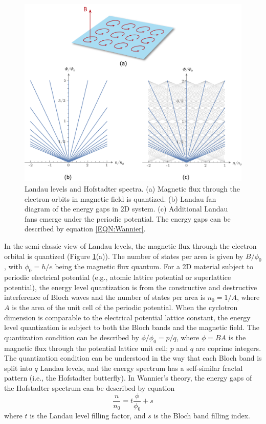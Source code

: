 \documentclass[pdflatex, sectionletters, 12pt]{pittetd}    %
\begin{document}
\begin{figure}[h!]
	\centering
	\includegraphics[width=1.0\textwidth]{Drawing/HofstadterLandau.pdf}
	\caption{Landau levels and Hofstadter spectra. (a) Magnetic flux through the electron orbits in magnetic field is quantized. (b) Landau fan diagram of the energy gaps in 2D system. (c) Additional Landau fans emerge under the periodic potential. The energy gaps can be described by equation \ref{EQN:Wannier}.}
	\label{FIG:HofstadterLandau}
\end{figure}

In the semi-classic view of Landau levels, the magnetic flux through the electron orbital is quantized (Figure \ref{FIG:HofstadterLandau}(a)). The number of states per area is given by $B/\phi_0$, with $\phi_0 = h/e$ being the magnetic flux quantum. For a 2D material subject to periodic electrical potential (e.g., atomic lattice potential or superlattice potential), the energy level quantization is from the constructive and destructive interference of Bloch waves and the number of states per area is $n_0 = 1/A$, where $A$ is the area of the unit cell of the periodic potential. When the cyclotron dimension is comparable to the electrical potential lattice constant, the energy level quantization is subject to both the Bloch bands and the magnetic field. The quantization condition can be described by $\phi/\phi_0 = p/q$, where $\phi = BA$ is the magnetic flux through the potential lattice unit cell; $p$ and $q$ are coprime integers\cite{hofstadter1976energy}. The quantization condition can be understood in the way that each Bloch band is split into $q$ Landau levels, and the energy spectrum has a self-similar fractal pattern (i.e., the Hofstadter butterfly). In Wannier's theory\cite{wannier1978result}, the energy gaps of the Hofstadter spectrum can be described by equation 
\begin{equation}
\label{EQN:Wannier}
\frac{n}{n_0} = t\frac{\phi}{\phi_0} + s
\end{equation}
where $t$ is the Landau level filling factor, and $s$ is the Bloch band filling index\cite{streda1982quantised thouless1984quantized}.  
\end{document}
